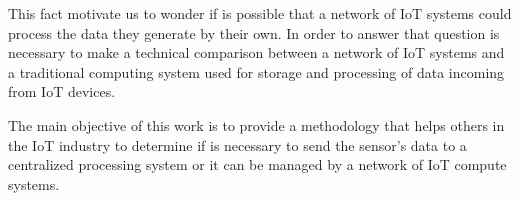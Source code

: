 This fact motivate us to wonder if is possible that a network of IoT systems
could process the data they generate by their own. In order to answer that
question is necessary to make a technical comparison between a network of  IoT
systems and a traditional computing system used for storage and processing of
data incoming from IoT devices. 

The main objective of this work is to provide a methodology that helps others
in the IoT industry to determine if is necessary to send the sensor's data to a
centralized processing system or it can be managed by a network of IoT compute
systems. 

\clearpage
